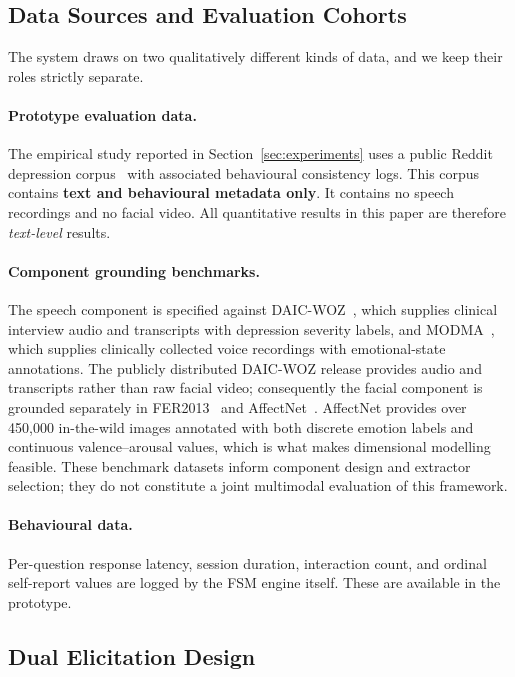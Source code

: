 \documentclass[12pt]{article}
\begin{document}
\subsection{Data Sources and Evaluation Cohorts}
\label{sec:data}

The system draws on two qualitatively different kinds of data, and we
keep their roles strictly separate.

\paragraph{Prototype evaluation data.} The empirical study reported in
Section~\ref{sec:experiments} uses a public Reddit depression
corpus~\cite{redditdepression} with associated behavioural consistency
logs. This corpus contains
\textbf{text and behavioural metadata only}. It contains no speech
recordings and no facial video. All quantitative results in this paper
are therefore \emph{text-level} results.

\paragraph{Component grounding benchmarks.} The speech component is
specified against DAIC-WOZ~\cite{gratch2014daic}, which supplies
clinical interview audio and transcripts with depression severity
labels, and MODMA~\cite{liu2022modma}, which supplies clinically
collected voice recordings with emotional-state annotations. The
publicly distributed DAIC-WOZ release provides audio and transcripts
rather than raw facial video; consequently the facial component is
grounded separately in FER2013~\cite{goodfellow2013fer} and
AffectNet~\cite{mollahosseini2017affectnet}. AffectNet provides over
450{,}000 in-the-wild images annotated with both discrete emotion labels
and continuous valence--arousal values, which is what makes dimensional
modelling feasible. These benchmark datasets inform component design and
extractor selection; they do not constitute a joint multimodal
evaluation of this framework.

\paragraph{Behavioural data.} Per-question response latency, session
duration, interaction count, and ordinal self-report values are logged
by the FSM engine itself. These are available in the prototype.

\subsection{Dual Elicitation Design}
\end{document}
